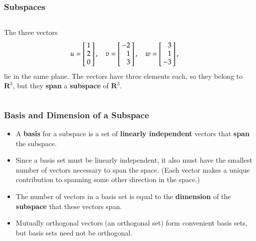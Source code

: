 \documentclass[10pt]{beamer}
\begin{document}
\begin{frame}
\frametitle{Subspaces}

\begin{columns}
\begin{column}{0.5\textwidth}
The three vectors
\begin{equation*}
    u = \left[\negthickspace\begin{array}{r}  1 \\  2 \\  0 \end{array}\negthickspace\right],
    \quad
    v = \left[\negthickspace\begin{array}{r} -2 \\  1 \\ 3 \end{array}\negthickspace\right],
    \quad
    w = \left[\negthickspace\begin{array}{r}  3 \\  1 \\ -3 \end{array}\negthickspace\right],
\end{equation*}
lie in the same plane.  The vectors have three elements each, so they
belong to $\mathbf{R}^3$, but they \textbf{span} a \textbf{subspace} of
$\mathbf{R}^3$.
\end{column}
\begin{column}{0.45\textwidth}
\end{column}
\end{columns}

\end{frame}
\begin{frame}
\frametitle{Basis and Dimension of a Subspace}

\begin{itemize}
    \item   A \textbf{basis} for a subspace is a set of \textbf{linearly independent}
            vectors that \textbf{span} the subspace.

    \item   Since a basis set must be linearly independent, it also must have the
            smallest number of vectors necessary to span the space.  (Each vector makes a
            unique contribution to spanning some other direction in the space.)

    \item   The number of vectors in a basis set is equal to the \textbf{dimension}
            of the \textbf{subspace} that these vectors span.

    \item   Mutually orthogonal vectors (an orthogonal set) form convenient basis
            sets, but basis sets need not be orthogonal.
\end{itemize}

\end{frame}
\end{document}
